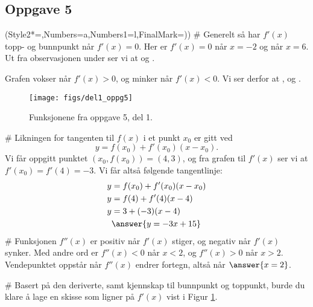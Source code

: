 \subsection*{Oppgave 5}
\begin{easylist}[enumerate]
\ListProperties(Style2*=,Numbers=a,Numbers1=l,FinalMark={)})
# Generelt så har $f'(x)$ topp- og bunnpunkt når $f'(x) = 0$.
Her er $f'(x) = 0$ når $x = -2$ og når $x = 6$. Ut fra observasjonen under ser vi at  og . 

Grafen vokser når $f'(x) > 0$, og minker når $f'(x) < 0$. Vi ser derfor at , og .

\begin{figure}[ht!]
	\centering
	\texttt{[image: figs/del1\_oppg5]}
	\caption{Funksjonene fra oppgave 5, del 1.}
	\label{fig:del1_oppg5}
\end{figure}

# Likningen for tangenten til $f(x)$ i et punkt $x_0$ er gitt ved
\begin{equation*}
	y = f(x_0) + f'(x_0) ( x - x_0).
\end{equation*}
Vi får oppgitt punktet $(x_0, f(x_0)) = (4, 3)$, og fra grafen til $f'(x)$
ser vi at $f'(x_0) = f'(4) = -3$. Vi får altså følgende tangentlinje:
\begin{align*}
	y &= f(x_0) + f'(x_0) ( x - x_0) \\
	y &= f(4) + f'(4) ( x - 4) \\
	y &= 3 + (-3) ( x - 4) \\
	& \answer{y = -3x + 15 }
\end{align*}
# Funksjonen $f''(x)$ er positiv når $f'(x)$ stiger, og negativ når $f'(x)$ synker.
Med andre ord er $f''(x) < 0$ når $x < 2$, og $f''(x) > 0$ når $x > 2$.
Vendepunktet oppstår når $f''(x)$ endrer fortegn, altså når $\answer{x=2}$.

# Basert på den deriverte, samt kjennskap til bunnpunkt og toppunkt, burde du klare å lage en skisse som ligner på $f'(x)$ vist i Figur \ref{fig:del1_oppg5}.
\end{easylist}

